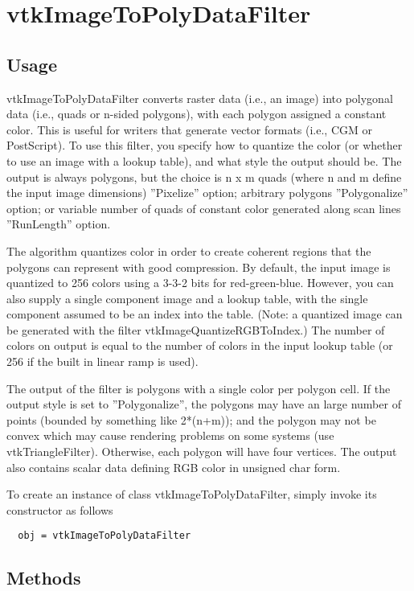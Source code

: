 \section{vtkImageToPolyDataFilter}

\subsection{Usage}

 vtkImageToPolyDataFilter converts raster data (i.e., an image) into
 polygonal data (i.e., quads or n-sided polygons), with each polygon
 assigned a constant color. This is useful for writers that generate vector
 formats (i.e., CGM or PostScript). To use this filter, you specify how to
 quantize the color (or whether to use an image with a lookup table), and
 what style the output should be. The output is always polygons, but the
 choice is n x m quads (where n and m define the input image dimensions)
 ''Pixelize'' option; arbitrary polygons ''Polygonalize'' option; or variable
 number of quads of constant color generated along scan lines ''RunLength''
 option.

 The algorithm quantizes color in order to create coherent regions that the
 polygons can represent with good compression. By default, the input image
 is quantized to 256 colors using a 3-3-2 bits for red-green-blue. However,
 you can also supply a single component image and a lookup table, with the
 single component assumed to be an index into the table.  (Note: a quantized
 image can be generated with the filter vtkImageQuantizeRGBToIndex.) The
 number of colors on output is equal to the number of colors in the input
 lookup table (or 256 if the built in linear ramp is used).

 The output of the filter is polygons with a single color per polygon cell.
 If the output style is set to ''Polygonalize'', the polygons may have an
 large number of points (bounded by something like 2*(n+m)); and the
 polygon may not be convex which may cause rendering problems on some
 systems (use vtkTriangleFilter). Otherwise, each polygon will have four
 vertices. The output also contains scalar data defining RGB color in
 unsigned char form.


To create an instance of class vtkImageToPolyDataFilter, simply
invoke its constructor as follows
\begin{verbatim}
  obj = vtkImageToPolyDataFilter
\end{verbatim}
\subsection{Methods}

